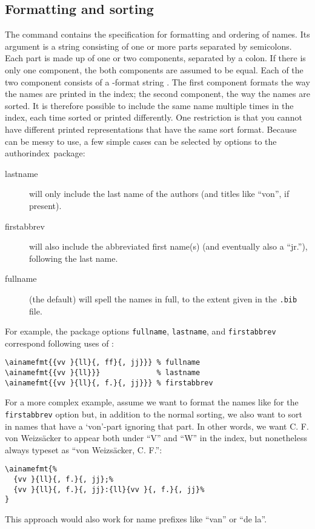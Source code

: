 \documentclass[a4paper]{article}
\newcommand{\package}[1]{\textsf{#1}}
\newcommand{\authorindex}{\package{authorindex}}
\newcommand{\file}[1]{\texttt{#1}}
\newcommand{\fnext}[1]{\file{.#1}}
\newcommand{\ltxinp}[1]{\texttt{\string#1}}
\begin{document}
\subsection{Formatting and sorting}

The command \ltxinp{\ainamefmt} contains the specification for formatting and
ordering of names. Its argument is a string consisting of one or more parts
separated by semicolons.  Each part is made up of one or two components,
separated by a colon.  If there is only one component, the both components are
assumed to be equal.  Each of the two component consists of a \BibTeX-format
string \cite{Patashnik88b}. The first component formats the way the names are
printed in the index; the second component, the way the names are sorted.  It
is therefore possible to include the same name multiple times in the index,
each time sorted or printed differently. One restriction is that you cannot
have different printed representations that have the same sort format. Because
\ltxinp{\ainamefmt} can be messy to use, a few simple cases can be selected by
options to the \authorindex\ package: {\small
\begin{description}
\item[lastname] will only include the last name of the authors (and titles like
  ``von'', if present).
\item[firstabbrev] will also include the abbreviated first name(s) (and
  eventually also a ``jr.''), following the last name.
\item[fullname] (the default) will spell the names in full, to the extent given
  in the \fnext{bib} file.
\end{description}}

For example, the package options \ltxinp{fullname}, \ltxinp{lastname}, and
\ltxinp{firstabbrev} correspond following uses of \ltxinp{\ainamefmt}:
\begin{verbatim}
\ainamefmt{{vv }{ll}{, ff}{, jj}}} % fullname
\ainamefmt{{vv }{ll}}}             % lastname
\ainamefmt{{vv }{ll}{, f.}{, jj}}} % firstabbrev
\end{verbatim}

For a more complex example, assume we want to format the names like for the
\ltxinp{firstabbrev} option but, in addition to the normal sorting, we also
want to sort in names that have a `von'-part ignoring that part.  In other
words, we want C. F. von Weizs\"{a}cker to appear both under ``V'' and ``W'' in
the index, but nonetheless always typeset as ``von Weizs\"{a}cker, C. F.'':
\begin{verbatim}
\ainamefmt{%
  {vv }{ll}{, f.}{, jj};%
  {vv }{ll}{, f.}{, jj}:{ll}{vv }{, f.}{, jj}%
}
\end{verbatim}
This approach would also work for name prefixes like ``van'' or ``de la''.
\end{document}
